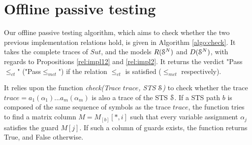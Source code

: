 \section{Offline passive testing}
\label{sec:testing:offline}

Our offline passive testing algorithm, which aims to check
whether the two previous implementation relations hold, is given
in Algorithm \ref{algo:check}. It takes the complete traces of
$\mathit{Sut}$, and the models $R(\EuScript{S}^{N})$ and
$D(\EuScript{S}^{N})$, with regards to Propositions
\ref{rel:impl12} and \ref{rel:impl2}. It returns the verdict
"Pass$\leq_{ct}$" ("Pass$\leq_{mct}$") if the relation
$\leq_{ct}$ is satisfied ($\leq_{mct}$ respectively).

It relies upon the function \textit{check(Trace $trace$, STS
$\EuScript{S}$)} to check whether the trace
$trace=a_1(\alpha_1)...a_m(\alpha_m)$ is also a trace of the STS
$\EuScript{S}$. If a STS path $b$ is composed of the same
sequence of symbols as the trace $trace$, the function tries to
find a matrix column  $M=M_{[b]}[*,i]$ such that every variable
assignment $\alpha_j$ satisfies the guard $M[j]$. If such a
column of guards exists, the function returns True, and False
otherwise.

